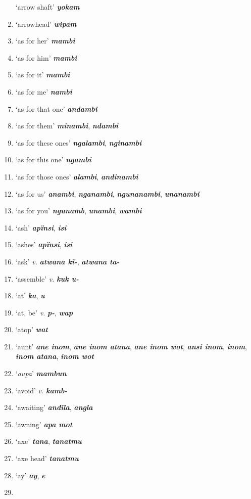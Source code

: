\begin{enumerate}[noitemsep, label={}, align=left, widest=190, labelsep=1ex,leftmargin=*,itemindent=-10pt]
‘arrow shaft’ \textbf{\textit{yokam}} \item
‘arrowhead’ \textbf{\textit{wipam}} \item
‘as for her’ \textbf{\textit{mambi}} \item
‘as for him’ \textbf{\textit{mambi}} \item
‘as for it’ \textbf{\textit{mambi}} \item
‘as for me’ \textbf{\textit{nambi}} \item
‘as for that one’ \textbf{\textit{andambi}} \item
‘as for them’ \textbf{\textit{minambi}}, \textbf{\textit{ndambi}} \item
‘as for these ones’ \textbf{\textit{ngalambi}}, \textbf{\textit{nginambi}} \item
‘as for this one’ \textbf{\textit{ngambi}} \item
‘as for those ones’ \textbf{\textit{alambi}}, \textbf{\textit{andinambi}} \item
‘as for us’ \textbf{\textit{anambi}}, \textbf{\textit{nganambi}}, \textbf{\textit{ngunanambi}}, \textbf{\textit{unanambi}} \item
‘as for you’ \textbf{\textit{ngunamb}}, \textbf{\textit{unambi}}, \textbf{\textit{wambi}} \item
‘ash’ \textbf{\textit{apïnsi}}, \textbf{\textit{isi}} \item
‘ashes’ \textbf{\textit{apïnsi}}, \textbf{\textit{isi}} \item
‘ask’ \textit{v.} \textbf{\textit{atwana kï-}}, \textbf{\textit{atwana ta-}} \item
‘assemble’ \textit{v.} \textbf{\textit{kuk u-}} \item
‘at’ \textbf{\textit{ka}}, \textbf{\textit{u}} \item
‘at, be’ \textit{v.} \textbf{\textit{p-}}, \textbf{\textit{wap}} \item
‘atop’ \textbf{\textit{wat}} \item
‘aunt’ \textbf{\textit{ane inom}}, \textbf{\textit{ane inom atana}}, \textbf{\textit{ane inom wot}}, \textbf{\textit{ansi inom}}, \textbf{\textit{inom}}, \textbf{\textit{inom atana}}, \textbf{\textit{inom wot}} \item
‘\textit{aupa}’ \textbf{\textit{mambun}} \item
‘avoid’ \textit{v.} \textbf{\textit{kamb-}} \item
‘awaiting’ \textbf{\textit{andïla}}, \textbf{\textit{angla}} \item
‘awning’ \textbf{\textit{apa mot}} \item
‘axe’ \textbf{\textit{tana}}, \textbf{\textit{tanatmu}} \item
‘axe head’ \textbf{\textit{tanatmu}} \item
‘ay’ \textbf{\textit{ay}}, \textbf{\textit{e}}\\ \item


\end{enumerate}
